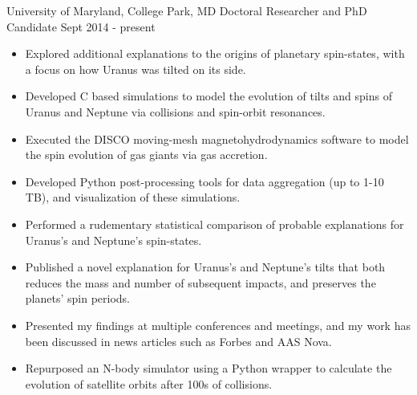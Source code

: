 \documentclass[]{awesome-cv}
\begin{document}
\vspace{-10mm}

\begin{cventries}
		\cventry
		{University of Maryland, College Park, MD}
		{Doctoral Researcher and PhD Candidate}
		{Sept 2014 - present}
		{}
		{\vspace{-3mm}
			\begin{itemize}
				\item Explored additional explanations to the origins of planetary spin-states, with a focus on how Uranus was tilted on its side. \vspace{0.7mm}
				\item Developed C based simulations to model the evolution of tilts and spins of Uranus and Neptune via collisions and spin-orbit resonances. \vspace{0.7mm}
				\item Executed the DISCO moving-mesh magnetohydrodynamics software to model the spin evolution of gas giants via gas accretion. \vspace{0.7mm} 
				\item Developed Python post-processing tools for data aggregation (up to 1-10 TB), and visualization of these simulations. \vspace{0.7mm}
				\item Performed a rudementary statistical comparison of probable explanations for Uranus's and Neptune's spin-states. \vspace{0.7mm}
				\item Published a novel explanation for Uranus's and Neptune's tilts that both reduces the mass and number of subsequent impacts, and preserves the planets' spin periods. \vspace{0.7mm}
				\item Presented my findings at multiple conferences and meetings, and my work has been discussed in news articles such as Forbes and AAS Nova. \vspace{0.7mm}
				\item Repurposed an N-body simulator using a Python wrapper to calculate the evolution of satellite orbits after 100s of collisions. \vspace{0.7mm}
			\end{itemize}
		}
	

\end{cventries}
\end{document}
